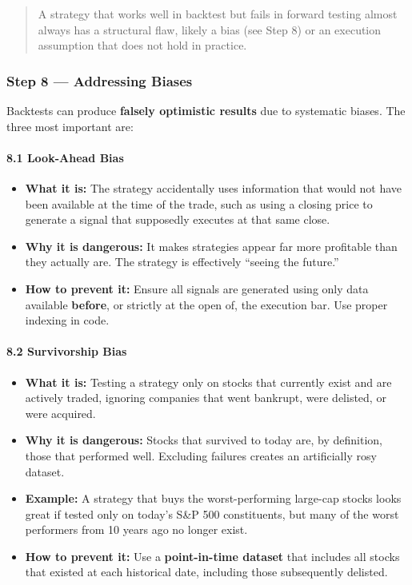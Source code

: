 \documentclass[12pt,openany]{book}
\begin{document}
\begin{quote}
    A strategy that works well in backtest but fails in forward testing almost always has a structural flaw, likely a bias (see Step 8) or an execution assumption that does not hold in practice.
\end{quote}

\subsubsection{Step 8 --- Addressing Biases}

Backtests can produce \textbf{falsely optimistic results} due to systematic biases. The three most important are:

\paragraph{8.1 Look-Ahead Bias}
\begin{itemize}[leftmargin=*]
    \item \textbf{What it is:} The strategy accidentally uses information that would not have been available at the time of the trade, such as using a closing price to generate a signal that supposedly executes at that same close.
    \item \textbf{Why it is dangerous:} It makes strategies appear far more profitable than they actually are. The strategy is effectively ``seeing the future.''
    \item \textbf{How to prevent it:} Ensure all signals are generated using only data available \textbf{before}, or strictly at the open of, the execution bar. Use proper indexing in code.
\end{itemize}

\paragraph{8.2 Survivorship Bias}
\begin{itemize}[leftmargin=*]
    \item \textbf{What it is:} Testing a strategy only on stocks that currently exist and are actively traded, ignoring companies that went bankrupt, were delisted, or were acquired.
    \item \textbf{Why it is dangerous:} Stocks that survived to today are, by definition, those that performed well. Excluding failures creates an artificially rosy dataset.
    \item \textbf{Example:} A strategy that buys the worst-performing large-cap stocks looks great if tested only on today's S\&P 500 constituents, but many of the worst performers from 10 years ago no longer exist.
    \item \textbf{How to prevent it:} Use a \textbf{point-in-time dataset} that includes all stocks that existed at each historical date, including those subsequently delisted.
\end{itemize}
\end{document}
